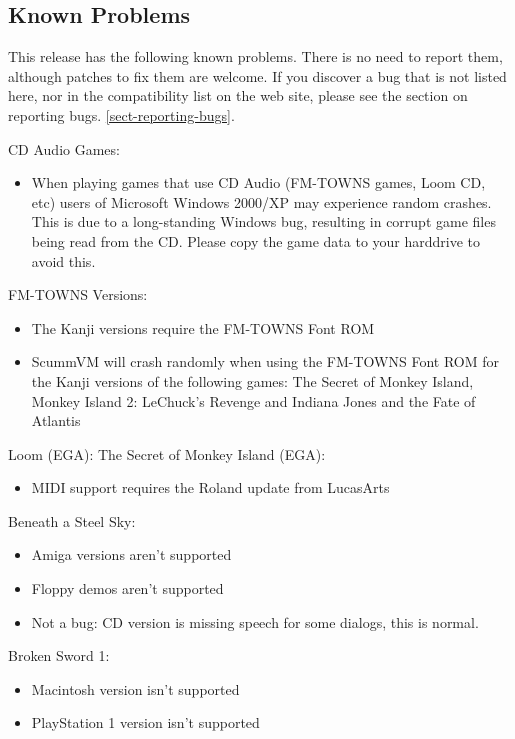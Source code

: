 


\subsection{Known Problems}

This release has the following known problems. There is no need to report them,
although patches to fix them are welcome. If you discover a bug that is not
listed here, nor in the compatibility list on the web site, please see
the section on reporting bugs. \ref{sect-reporting-bugs}.

CD Audio Games:
  \begin{itemize}
  \item When playing games that use CD Audio (FM-TOWNS games, Loom CD, etc)
            users of Microsoft Windows 2000/XP may experience random crashes.
            This is due to a long-standing Windows bug, resulting in corrupt
            game files being read from the CD. Please copy the game data to
            your harddrive to avoid this.
  \end{itemize}
FM-TOWNS Versions:
  \begin{itemize}
  \item The Kanji versions require the FM-TOWNS Font ROM
  \item ScummVM will crash randomly when using the FM-TOWNS Font ROM for
            the Kanji versions of the following games:
            The Secret of Monkey Island, Monkey Island 2: LeChuck's Revenge
            and Indiana Jones and the Fate of Atlantis
  \end{itemize}
Loom (EGA):
The Secret of Monkey Island (EGA):
  \begin{itemize}
  \item MIDI support requires the Roland update from LucasArts
  \end{itemize}
Beneath a Steel Sky:
  \begin{itemize}
  \item Amiga versions aren't supported
  \item Floppy demos aren't supported
  \item Not a bug: CD version is missing speech for some dialogs, this is
            normal.
  \end{itemize}
Broken Sword 1:
  \begin{itemize}
  \item Macintosh version isn't supported
  \item PlayStation 1 version isn't supported
  \end{itemize}
